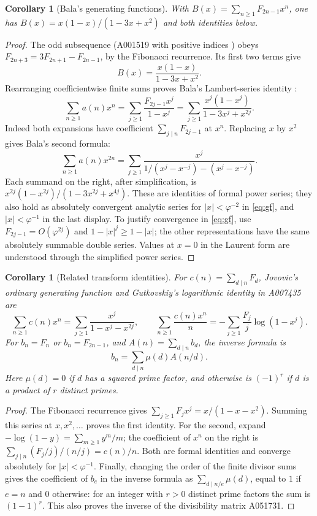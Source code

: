 \documentclass[11pt]{article}
\newtheorem{corollary}[theorem]{Corollary}
\newcommand{\ph}{\varphi}
\begin{document}
\begin{corollary}[Bala's generating functions]\label{cor:gf}
With $B(x)=\sum_{n\geq1}F_{2n-1}x^n$, one has
$B(x)=x(1-x)/(1-3x+x^2)$ and both identities below.
\end{corollary}
\begin{proof}
The odd subsequence
(A001519 with positive indices \cite{odd}) obeys
$F_{2n+3}=3F_{2n+1}-F_{2n-1}$, by the Fibonacci recurrence. Its
first two terms give
\[
 B(x)=\frac{x(1-x)}{1-3x+x^2}.
\]
Rearranging coefficientwise finite sums proves Bala's Lambert-series
identity \cite{adamson}:
\begin{equation}\label{eq:gf}
 \sum_{n\geq1}a(n)x^n
 =\sum_{j\geq1}\frac{F_{2j-1}x^j}{1-x^j}
 =\sum_{j\geq1}\frac{x^j(1-x^j)}{1-3x^j+x^{2j}}.
\end{equation}
Indeed both expansions have coefficient
$\sum_{j\mid n}F_{2j-1}$ at $x^n$. Replacing $x$ by $x^2$ gives
Bala's second formula:
\[
 \sum_{n\geq1}a(n)x^{2n}
 =\sum_{j\geq1}
 \frac{x^j}{1/(x^j-x^{-j})-(x^j-x^{-j})}.
\]
Each summand on the right, after simplification, is
$x^{2j}(1-x^{2j})/(1-3x^{2j}+x^{4j})$.
These are identities of formal power series; they also hold as
absolutely convergent analytic series for $|x|<\ph^{-2}$ in
\eqref{eq:gf}, and $|x|<\ph^{-1}$ in the last display. To justify
convergence in \eqref{eq:gf}, use $F_{2j-1}=O(\ph^{2j})$ and
$1-|x|^j\geq1-|x|$; the other representations have the same
absolutely summable double series. Values at $x=0$ in the Laurent
form are understood through the simplified power series.
\end{proof}

\begin{corollary}[Related transform identities]\label{cor:related}
For $c(n)=\sum_{d\mid n}F_d$, Jovovic's ordinary generating function
and Gutkovskiy's logarithmic identity in A007435 are
\[
 \sum_{n\geq1}c(n)x^n
 =\sum_{j\geq1}\frac{x^j}{1-x^j-x^{2j}},\qquad
 \sum_{n\geq1}\frac{c(n)x^n}{n}
 =-\sum_{j\geq1}\frac{F_j}{j}\log(1-x^j).
\]
For $b_n=F_n$ or $b_n=F_{2n-1}$, and $A(n)=\sum_{d\mid n}b_d$,
the inverse formula is
\[
 b_n=\sum_{d\mid n}\mu(d)A(n/d).
\]
Here $\mu(d)=0$ if $d$ has a squared prime factor, and otherwise is
$(-1)^r$ if $d$ is a product of $r$ distinct primes.
\end{corollary}
\begin{proof}
The Fibonacci recurrence gives $\sum_{j\geq1}F_jx^j=x/(1-x-x^2)$.
Summing this series at $x,x^2,\ldots$ proves the first identity.
For the second, expand $-\log(1-y)=\sum_{m\geq1}y^m/m$;
the coefficient of $x^n$ on the right is
$\sum_{j\mid n}(F_j/j)/(n/j)=c(n)/n$.
Both are formal identities and converge absolutely for $|x|<\ph^{-1}$.
Finally, changing the order of the finite divisor sums gives the
coefficient of $b_e$ in the inverse formula as
$\sum_{d\mid n/e}\mu(d)$, equal to $1$ if $e=n$ and $0$ otherwise:
for an integer with $r>0$ distinct prime factors the sum is $(1-1)^r$.
This also proves the inverse of the divisibility matrix A051731.
\end{proof}
\end{document}
